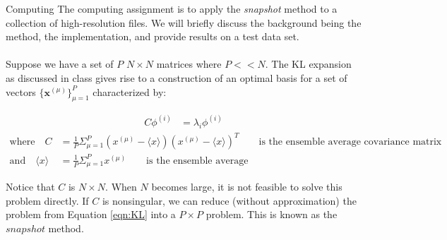 \newpage
\begin{section}{Computing}
The computing assignment is to apply the \textit{snapshot} method to a collection of high-resolution files. We will briefly discuss the background being the method, the implementation, and provide results on a test data set.
\\
\\
Suppose we have a set of $P$ $N \times N$ matrices where $P << N$. The KL expansion as discussed in class gives rise to a construction of an optimal basis for a set of vectors $\lbrace{\bm{x}^{(\mu)}} \rbrace_{\mu=1}^P$ characterized by:

\begin{align}
	C \phi^{(i)} &= \lambda_i \phi^{(i)} \label{eqn:KL}
\end{align}
\begin{align*}
	\text{where} \quad C &= \frac{1}{P} \Sigma_{\mu=1}^P (x^{(\mu)} - \langle x \rangle )(x^{(\mu)} - \langle x \rangle )^T \qquad \text{is the ensemble average covariance matrix} \\
	\text{and} \quad \langle x \rangle &= \frac{1}{P} \Sigma_{\mu=1}^P x^{(\mu)} \qquad \text{is the ensemble average}
\end{align*}

Notice that $C$ is $N \times N$. When $N$ becomes large, it is not feasible to solve this problem directly. If $C$ is nonsingular, we can reduce (without approximation) the problem from Equation \ref{eqn:KL} into a $P \times P$ problem. This is known as the $snapshot$ method.

\vspace{10pt}

\end{section}
